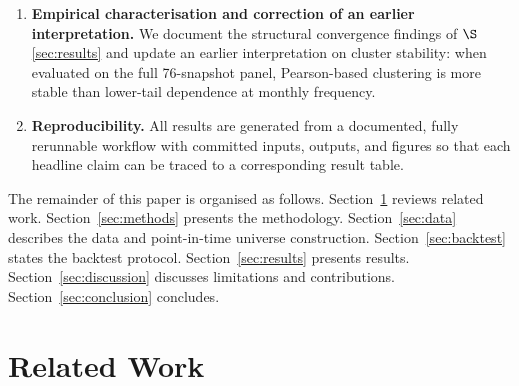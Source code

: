 \documentclass[11pt,a4paper]{article}
\begin{document}
\begin{enumerate}
      robustness check. (iii) Inference around every comparison: the
      reference Hansen SPA implementation \citep{hansen2005spa}, a
      \emph{studentized} Ledoit--Wolf Sharpe-difference test
      \citep{ledoitwolf2008sharpe}, and the Politis--Romano stationary
      block bootstrap \citep{politis1994bootstrap,politis2004blocklength}.
      (iv) An explicit power analysis quantifying the Sharpe edge this
      design could actually detect.
\item \textbf{Empirical characterisation and correction of an earlier interpretation.}
      We document the structural convergence findings of
      $\S$\ref{sec:results} and update an earlier interpretation on
      cluster stability: when evaluated on the full 76-snapshot panel,
      Pearson-based clustering is more stable than lower-tail dependence
      at monthly frequency.
\item \textbf{Reproducibility.} All results are generated from a
      documented, fully rerunnable workflow with committed inputs,
      outputs, and figures so that each headline claim can be traced
      to a corresponding result table.
\end{enumerate}

The remainder of this paper is organised as follows. Section~\ref{sec:related}
reviews related work. Section~\ref{sec:methods} presents the methodology. Section~\ref{sec:data} describes the data and
point-in-time universe construction. Section~\ref{sec:backtest} states the
backtest protocol. Section~\ref{sec:results} presents results.
Section~\ref{sec:discussion} discusses limitations and contributions.
Section~\ref{sec:conclusion} concludes.

\section{Related Work}
\label{sec:related}
\end{document}
